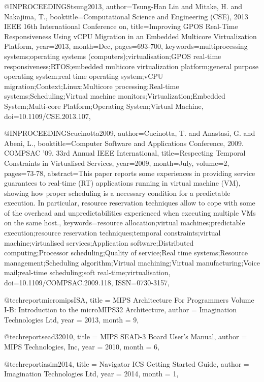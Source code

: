@INPROCEEDINGS{tsung2013, 
author={Tsung-Han Lin and Mitake, H. and Nakajima, T.}, 
booktitle={Computational Science and Engineering (CSE), 2013 IEEE 16th International Conference on}, 
title={Improving GPOS Real-Time Responsiveness Using vCPU Migration in an Embedded Multicore Virtualization Platform}, 
year={2013}, 
month={Dec}, 
pages={693-700}, 
keywords={multiprocessing systems;operating systems (computers);virtualisation;GPOS real-time responsiveness;RTOS;embedded multicore virtualization platform;general purpose operating system;real time operating system;vCPU migration;Context;Linux;Multicore processing;Real-time systems;Scheduling;Virtual machine monitors;Virtualization;Embedded System;Multi-core Platform;Operating System;Virtual Machine}, 
doi={10.1109/CSE.2013.107},}

@INPROCEEDINGS{cucinotta2009, 
author={Cucinotta, T. and Anastasi, G. and Abeni, L.}, 
booktitle={Computer Software and Applications Conference, 2009. COMPSAC '09. 33rd Annual IEEE International}, 
title={Respecting Temporal Constraints in Virtualised Services}, 
year={2009}, 
month={July}, 
volume={2}, 
pages={73-78}, 
abstract={This paper reports some experiences in providing service guarantees to real-time (RT) applications running in virtual machine (VM), showing how proper scheduling is a necessary condition for a predictable execution. In particular, resource reservation techniques allow to cope with some of the overhead and unpredictabilities experienced when executing multiple VMs on the same host.}, 
keywords={resource allocation;virtual machines;predictable execution;resource reservation techniques;temporal constraints;virtual machine;virtualised services;Application software;Distributed computing;Processor scheduling;Quality of service;Real time systems;Resource management;Scheduling algorithm;Virtual machining;Virtual manufacturing;Voice mail;real-time scheduling;soft real-time;virtualisation}, 
doi={10.1109/COMPSAC.2009.118}, 
ISSN={0730-3157},}

@techreport{micromipsISA,
     title = {{MIPS Architecture For Programmers Volume I-B: Introduction to the microMIPS32 Architecture}},
     author = {{Imagination Technologies Ltd}},
     year = {2013},
     month = {9},
}

@techreport{sead32010,
     title = {{MIPS SEAD-3 Board User’s Manual}},
     author = {{MIPS Technologies, Inc}},
     year = {2010},
     month = {6},
}

@techreport{iasim2014,
     title = {{Navigator ICS Getting Started Guide}},
     author = {{Imagination Technologies Ltd}},
     year = {2014},
     month = {1},
}



